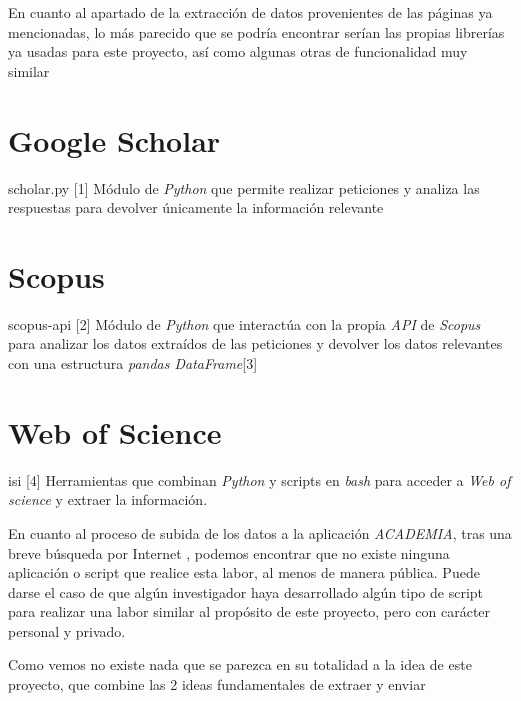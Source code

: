 
En cuanto al apartado de la extracción de datos provenientes de las páginas ya mencionadas, lo más parecido que se podría encontrar serían las propias librerías ya usadas para este proyecto, así como algunas otras de funcionalidad muy similar

\section{Google Scholar}
scholar.py [1] Módulo de \emph{Python} que permite realizar peticiones y analiza las respuestas para devolver únicamente la información relevante
\section{Scopus}
scopus-api [2] Módulo de \emph{Python} que interactúa con la propia \emph{API} de \emph{Scopus}	para analizar los datos extraídos de las peticiones y devolver los datos relevantes con una estructura \emph{pandas DataFrame}[3]
\section{Web of Science}
isi [4] Herramientas que combinan \emph{Python} y scripts en \emph{bash} para acceder a \emph{Web of science} y extraer la información.

En cuanto al proceso de subida de los datos a la aplicación \emph{ACADEMIA}, tras una breve búsqueda por Internet , podemos encontrar que no existe ninguna aplicación o script que realice esta labor, al menos de manera pública. Puede darse el caso de que algún investigador haya desarrollado algún tipo de script para realizar una labor similar al propósito de este proyecto, pero con carácter personal y privado.

Como vemos no existe nada que se parezca en su totalidad a la idea de este proyecto, que combine las 2 ideas fundamentales de extraer y enviar	